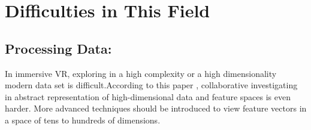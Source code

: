 \documentclass[10pt,twocolumn,letterpaper]{article}
\begin{document}






\section{Difficulties in This Field}

\subsection{Processing Data:}In immersive VR, exploring in a high complexity or a high dimensionality modern data set is difficult.According to this paper \cite{Donalek2014}, collaborative investigating in abstract representation of high-dimensional data and feature spaces is even harder. More advanced techniques should be introduced to view feature vectors in a space of tens to hundreds of dimensions.
\end{document}
